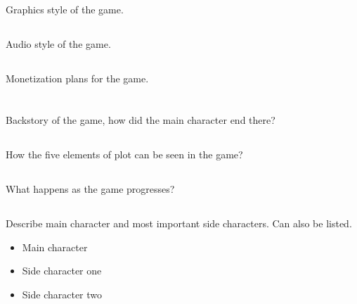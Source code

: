 \documentclass{article}
\begin{document}
\subsection*{\IId}
Graphics style of the game.
\subsection*{\IIe}
Audio style of the game.
\subsection*{\IIf}
Monetization plans for the game.
\section*{\III}
\subsection*{\IIIa}
Backstory of the game, how did the main character end there?
\subsection*{\IIIb}
How the five elements of plot can be seen in the game?
\subsection*{\IIIc}
What happens as the game progresses?
\subsection*{\IIId}
Describe main character and most important side characters. Can also be listed.
\begin{itemize}
	\item Main character
	\item Side character one 
	\item Side character two 
\end{itemize}
\end{document}
